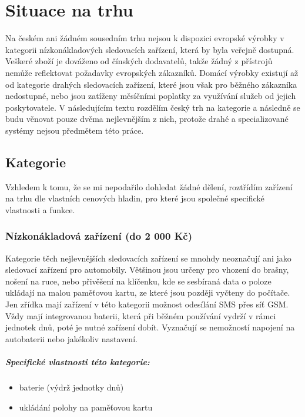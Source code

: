 \documentclass[FM,BP]{tulthesis}  %
\begin{document}
\chapter{Situace na trhu}
Na českém ani žádném sousedním trhu nejsou k dispozici evropské výrobky v kategorii nízkonákladových sledovacích zařízení, která by byla veřejně dostupná. Veškeré zboží je dováženo od čínských dodavatelů, takže žádný z přístrojů nemůže reflektovat požadavky evropských zákazníků. Domácí výrobky existují až od kategorie drahých sledovacích zařízení, které jsou však pro běžného zákazníka nedostupné, nebo jsou zatíženy měsíčními poplatky za využívání služeb od jejich poskytovatele. V následujícím textu rozdělím český trh na kategorie a následně se budu věnovat pouze dvěma nejlevnějším z nich, protože drahé a specializované systémy nejsou předmětem této práce.

\section{Kategorie}
Vzhledem k tomu, že se mi nepodařilo dohledat žádné dělení, roztřídím zařízení na trhu dle vlastních cenových hladin, pro které jsou společné specifické vlastnosti a funkce.

\subsection{Nízkonákladová zařízení (do 2 000 Kč)}
Kategorie těch nejlevnějších sledovacích zařízení se mnohdy neoznačují ani jako sledovací zařízení pro automobily. Většinou jsou určeny pro vhození do brašny, nošení na ruce, nebo přivěšení na klíčenku, kde se sesbíraná data o poloze ukládají na malou paměťovou kartu, ze které jsou později vyčteny do počítače. Jen zřídka mají zařízení v této kategorii možnost odesílání SMS přes síť GSM. Vždy mají integrovanou baterii, která při běžném používání vydrží v rámci jednotek dnů, poté je nutné zařízení dobít. Vyznačují se nemožností napojení na autobaterii nebo jakékoliv nastavení.

\paragraph{Specifické vlastnosti této kategorie:}
\begin{itemize}
\item baterie (výdrž jednotky dnů)
\item ukládání polohy na paměťovou kartu
\end{itemize}
\end{document}

